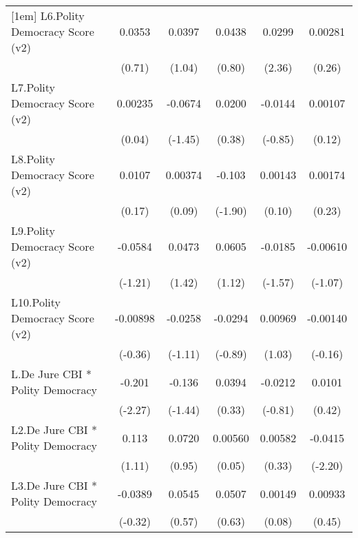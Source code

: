 {\begin{longtable}{l*{5}{c}}
[1em]
L6.Polity Democracy Score (v2)&   0.0353         &   0.0397         &   0.0438         &   0.0299\sym{*}  &  0.00281         \\
                &   (0.71)         &   (1.04)         &   (0.80)         &   (2.36)         &   (0.26)         \\
[1em]
L7.Polity Democracy Score (v2)&  0.00235         &  -0.0674         &   0.0200         &  -0.0144         &  0.00107         \\
                &   (0.04)         &  (-1.45)         &   (0.38)         &  (-0.85)         &   (0.12)         \\
[1em]
L8.Polity Democracy Score (v2)&   0.0107         &  0.00374         &   -0.103         &  0.00143         &  0.00174         \\
                &   (0.17)         &   (0.09)         &  (-1.90)         &   (0.10)         &   (0.23)         \\
[1em]
L9.Polity Democracy Score (v2)&  -0.0584         &   0.0473         &   0.0605         &  -0.0185         & -0.00610         \\
                &  (-1.21)         &   (1.42)         &   (1.12)         &  (-1.57)         &  (-1.07)         \\
[1em]
L10.Polity Democracy Score (v2)& -0.00898         &  -0.0258         &  -0.0294         &  0.00969         & -0.00140         \\
                &  (-0.36)         &  (-1.11)         &  (-0.89)         &   (1.03)         &  (-0.16)         \\
[1em]
L.De Jure CBI * Polity Democracy&   -0.201\sym{*}  &   -0.136         &   0.0394         &  -0.0212         &   0.0101         \\
                &  (-2.27)         &  (-1.44)         &   (0.33)         &  (-0.81)         &   (0.42)         \\
[1em]
L2.De Jure CBI * Polity Democracy&    0.113         &   0.0720         &  0.00560         &  0.00582         &  -0.0415\sym{*}  \\
                &   (1.11)         &   (0.95)         &   (0.05)         &   (0.33)         &  (-2.20)         \\
[1em]
L3.De Jure CBI * Polity Democracy&  -0.0389         &   0.0545         &   0.0507         &  0.00149         &  0.00933         \\
                &  (-0.32)         &   (0.57)         &   (0.63)         &   (0.08)         &   (0.45)         \\

\end{longtable}}
